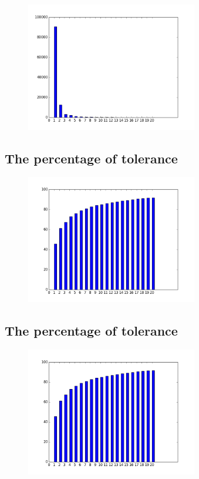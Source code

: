\documentclass[10pt, conference, compsocconf]{IEEEtran}
\begin{document}
\begin{figure}[H]\centering\includegraphics[width=75mm,scale=0.5]{BasedonCookienumberofusersfingerprint}\end{figure}\subsection{The percentage of tolerance}
\begin{figure}[H]\centering\includegraphics[width=75mm,scale=0.5]{BasedonCookietolerance}\end{figure}\subsection{The percentage of tolerance}
\begin{figure}[H]\centering\includegraphics[width=75mm,scale=0.5]{BasedonCookietolerance}\end{figure}
\end{document}
